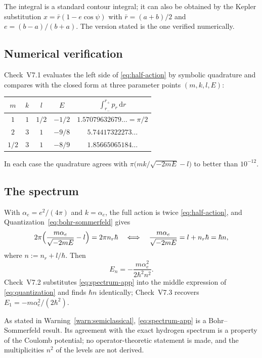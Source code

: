 \begin{remark}
The integral is a standard contour integral; it can also be obtained by the
Kepler substitution $x=\bar r(1-e\cos\psi)$ with $\bar r=(a+b)/2$ and
$e=(b-a)/(b+a)$.  The version stated is the one verified numerically.
\end{remark}

\subsection{Numerical verification}

Check~V7.1 evaluates the left side of \eqref{eq:half-action} by symbolic
quadrature and compares with the closed form at three parameter points
$(m,k,l,E)$:

\begin{center}\small
\renewcommand{\arraystretch}{1.2}
\begin{tabular}{@{}ccccc@{}}
\toprule
$m$ & $k$ & $l$ & $E$ & $\int_{r_-}^{r_+}p_r\,\mathrm dr$ \\
\midrule
$1$ & $1$ & $1/2$ & $-1/2$ & $1.57079632679\ldots=\pi/2$ \\
$2$ & $3$ & $1$ & $-9/8$ & $5.74417322273\ldots$ \\
$1/2$ & $3$ & $1$ & $-8/9$ & $1.85665065184\ldots$ \\
\bottomrule
\end{tabular}
\end{center}

In each case the quadrature agrees with
$\pi\bigl(mk/\sqrt{-2mE}-l\bigr)$ to better than $10^{-12}$.

\subsection{The spectrum}

With $\alpha_e=e^{2}/(4\pi)$ and $k=\alpha_e$, the full action is twice
\eqref{eq:half-action}, and Quantization~\eqref{eq:bohr-sommerfeld} gives
\begin{equation}\label{eq:quantization}
  2\pi\Bigl(\frac{m\alpha_e}{\sqrt{-2mE}}-l\Bigr)=2\pi n_r\hbar
  \quad\Longleftrightarrow\quad
  \frac{m\alpha_e}{\sqrt{-2mE}}=l+n_r\hbar=\hbar n ,
\end{equation}
where $n:=n_r+l/\hbar$.  Then
\begin{equation}\label{eq:spectrum-app}
  E_n=-\frac{m\alpha_e^{2}}{2\hbar^{2}n^{2}} .
\end{equation}
Check~V7.2 substitutes \eqref{eq:spectrum-app} into the middle expression of
\eqref{eq:quantization} and finds $\hbar n$ identically; Check~V7.3 recovers
$E_1=-m\alpha_e^{2}/(2\hbar^{2})$.

\begin{warning}
As stated in Warning~\ref{warn:semiclassical}, \eqref{eq:spectrum-app} is a
Bohr--Sommerfeld result.  Its agreement with the exact hydrogen spectrum is a
property of the Coulomb potential; no operator-theoretic statement is made, and
the multiplicities $n^{2}$ of the levels are not derived.
\end{warning}
